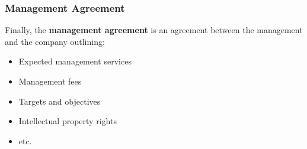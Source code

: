 \documentclass[a4paper]{extarticle}
\begin{document}
\subsubsection{Management Agreement}

Finally, the \textbf{management agreement} is an agreement between the management and the company outlining:

\begin{itemize}
    \item Expected management services
    \item Management fees
    \item Targets and objectives
    \item Intellectual property rights
    \item etc.
\end{itemize}
\end{document}
